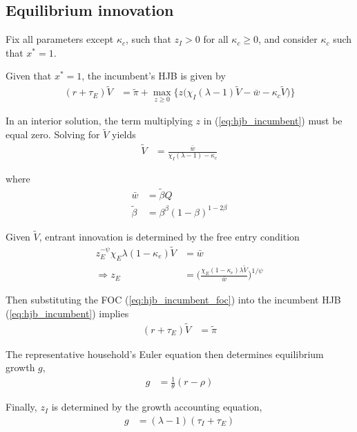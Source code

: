 \documentclass[12pt,english]{article}
\theoremstyle{remark}
\begin{document}
\subsection{Equilibrium innovation}

Fix all parameters except $\kappa_{c}$, such that $z_I > 0$ for all $\kappa_{c} \ge 0$, and consider $\kappa_{c}$ such that $x^* = 1$. 

Given that $x^* = 1$, the incumbent's HJB is given by 
\begin{align}
(r + \tau_E) \tilde{V} &= \tilde{\pi} + \max_{z \ge 0} \Big\{z \big(\chi_I (\lambda - 1) \tilde{V} - \bar{w} - \kappa_{c} \tilde{V}\big) \Big\} \label{eq:hjb_incumbent}
\end{align}

In an interior solution, the term multiplying $z$ in (\ref{eq:hjb_incumbent}) must be equal zero. Solving for $\tilde{V}$ yields
\begin{align}
	\tilde{V} &= \frac{\bar{w}}{\chi_I(\lambda - 1) - \kappa_{c}} \label{eq:hjb_incumbent_foc}
\end{align}

where 
\begin{align}
\bar{w} &= \tilde{\beta} Q \label{eq:wage_prod}\\
\tilde{\beta} &= \beta^{\beta}(1-\beta)^{1-2\beta} \label{eq:Kbeta}
\end{align}

Given $\tilde{V}$, entrant innovation is determined by the free entry condition
\begin{align}
	z_E^{-\psi} \chi_E \lambda (1-\kappa_{e}) \tilde{V} &= \bar{w}  \label{eq:free_entry}\\
	\Rightarrow z_E &= \Big( \frac{\chi_E (1-\kappa_{e}) \lambda \tilde{V}}{\bar{w}} \Big)^{1/\psi} \label{eq:effort_entrant}
\end{align}

Then substituting the FOC (\ref{eq:hjb_incumbent_foc}) into the incumbent HJB (\ref{eq:hjb_incumbent}) implies
\begin{align}
	(r + \tau_E) \tilde{V} &= \tilde{\pi} \label{eq:interest_rate}
\end{align}

The representative household's Euler equation then determines equilibrium growth $g$, 
\begin{align}
	g &= \frac{1}{\theta} (r - \rho) \label{eq:euler}
\end{align}

Finally, $z_I$ is determined by the growth accounting equation,
\begin{align}
	g &= (\lambda - 1)(\tau_I + \tau_E) \label{eq:growth_accounting}
\end{align}
\end{document}
